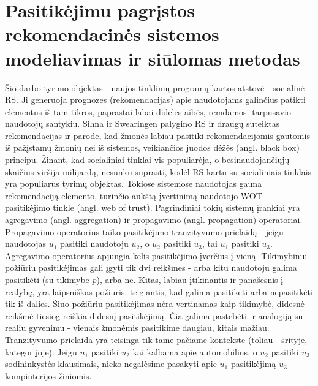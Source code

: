 \documentclass{VUMIFInfMagistrinis}
\begin{document}
\section{Pasitikėjimu pagrįstos rekomendacinės sistemos modeliavimas ir siūlomas metodas}
\indent
Šio darbo tyrimo objektas - naujos tinklinių programų kartos atstovė - socialinė RS. Ji generuoja prognozes (rekomendacijas) apie naudotojams galinčius patikti elementus iš tam tikros, paprastai labai didelės aibės, remdamosi tarpusavio naudotojų santykiu. Sihna ir Swearingen \cite{19} palygino RS ir draugų suteiktas rekomendacijas ir parodė, kad žmonės labiau pasitiki rekomendacijomis gautomis iš pažįstamų žmonių nei iš sistemos, veikiančios juodos dėžės (angl. black box) principu. Žinant, kad socialiniai tinklai vis populiarėja, o besinaudojančiųjų skaičius viršija milijardą, nesunku suprasti, kodėl RS kartu su socialiniais tinklais yra populiarus tyrimų objektas.
\newline
\indent 
Tokiose sistemose naudotojas gauna rekomendaciją elemento, turinčio aukštą įvertinimą naudotojo WOT - pasitikėjimo tinkle (angl. web of trust). Pagrindiniai tokių sistemų įrankiai yra agregavimo (angl. aggregation) ir propagavimo (angl. propagation) operatoriai. Propagavimo operatorius taiko pasitikėjimo tranzityvumo prielaidą - jeigu naudotojas $u_1$ pasitiki naudotoju $u_2$, o $u_2$ pasitiki $u_3$, tai $u_1$ pasitiki $u_3$. Agregavimo operatorius apjungia kelis pasitikėjimo įverčius į vieną.
\newline
\indent
Tikimybiniu požiūriu pasitikėjimas gali įgyti tik dvi reikšmes - arba kitu naudotoju galima pasitikėti (su tikimybe $p$), arba ne. Kitas, labiau įtikinantis ir panašesnis į realybę, yra laipsniškas požiūris, teigiantis, kad galima pasitikėti arba nepasitikėti tik iš dalies. Šiuo požiūriu pasitikėjimas nėra vertinamas kaip tikimybė, didesnė reikšmė tiesiog reiškia didesnį pasitikėjimą. Čia galima pastebėti ir analogiją su realiu gyvenimu - vienais žmonėmis pasitikime daugiau, kitais mažiau.
\newline
\indent
Tranzityvumo prielaida yra teisinga tik tame pačiame kontekste (toliau - srityje, kategorijoje). Jeigu $u_1$ pasitiki $u_2$ kai kalbama apie automobilius, o $u_2$ pasitiki $u_3$ sodininkystės klausimais, nieko negalėsime pasakyti apie $u_1$ pasitikėjimą $u_3$ kompiuterijos žiniomis. 
\newline
\indent
\end{document}

